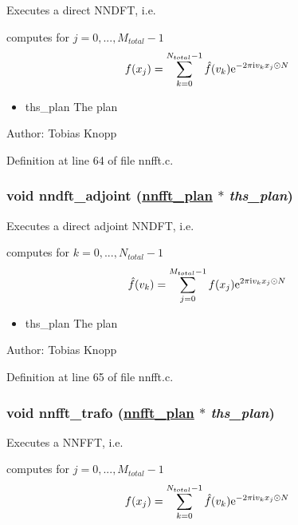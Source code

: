 Executes a direct NNDFT, i.e. 

computes for $j=0,...,M_{total}-1$ \[ f(x_j) = \sum_{k = 0}^{N_{total}-1} \hat{f}(v_k) {\rm e}^{-2 \pi \mbox{\rm\scriptsize i} v_k x_j \odot N} \]

\begin{itemize}
\item ths\_\-plan The plan\end{itemize}
\begin{Desc}
\item[Author:]Tobias Knopp \end{Desc}


Definition at line 64 of file nnfft.c.\hypertarget{group__nnfft_ga3}{
\subsubsection[nndft\_\-adjoint]{\setlength{\rightskip}{0pt plus 5cm}void nndft\_\-adjoint (\hyperlink{structnnfft__plan}{nnfft\_\-plan} $\ast$ {\em ths\_\-plan})}}
\label{group__nnfft_ga3}


Executes a direct adjoint NNDFT, i.e. 

computes for $k=0,...,N_{total}-1$ \[ \hat{f}(v_k) = \sum_{j = 0}^{M_{total}-1} f(x_j) {\rm e}^{2 \pi \mbox{\rm\scriptsize i} v_k x_j \odot N} \]

\begin{itemize}
\item ths\_\-plan The plan\end{itemize}
\begin{Desc}
\item[Author:]Tobias Knopp \end{Desc}


Definition at line 65 of file nnfft.c.\hypertarget{group__nnfft_ga4}{
\subsubsection[nnfft\_\-trafo]{\setlength{\rightskip}{0pt plus 5cm}void nnfft\_\-trafo (\hyperlink{structnnfft__plan}{nnfft\_\-plan} $\ast$ {\em ths\_\-plan})}}
\label{group__nnfft_ga4}


Executes a NNFFT, i.e. 

computes for $j=0,...,M_{total}-1$ \[ f(x_j) = \sum_{k = 0}^{N_{total}-1} \hat{f}(v_k) {\rm e}^{-2 \pi \mbox{\rm\scriptsize i} v_k x_j \odot N} \]

